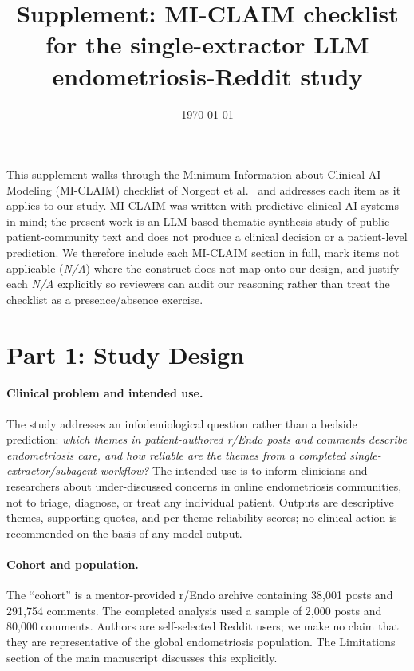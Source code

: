 \documentclass[11pt]{article}
\title{Supplement: MI-CLAIM checklist for the single-extractor
LLM endometriosis-Reddit study}
\date{\today}
\begin{document}
\maketitle

\noindent
This supplement walks through the Minimum Information about Clinical AI
Modeling (MI-CLAIM) checklist of Norgeot et al.~\cite{norgeot2020miclaim}
and addresses each item as it applies to our study. MI-CLAIM was written
with predictive clinical-AI systems in mind; the present work is an
LLM-based thematic-synthesis study of public patient-community text and
does not produce a clinical decision or a patient-level prediction. We
therefore include each MI-CLAIM section in full, mark items not
applicable (\emph{N/A}) where the construct does not map onto our
design, and justify each \emph{N/A} explicitly so reviewers can audit
our reasoning rather than treat the checklist as a presence/absence
exercise.

\section*{Part 1: Study Design}

\paragraph{Clinical problem and intended use.}
The study addresses an infodemiological question rather than a bedside
prediction: \emph{which themes in patient-authored r/Endo posts and
comments describe endometriosis care, and how reliable are the themes
from a completed single-extractor/subagent workflow?} The intended use
is to inform clinicians and researchers about under-discussed concerns
in online endometriosis communities, not to triage, diagnose, or treat
any individual patient. Outputs are descriptive themes, supporting
quotes, and per-theme reliability scores; no clinical action is
recommended on the basis of any model output.

\paragraph{Cohort and population.}
The ``cohort'' is a mentor-provided r/Endo archive containing
38{,}001 posts and 291{,}754 comments. The completed analysis used a
sample of 2{,}000 posts and 80{,}000 comments. Authors are
self-selected Reddit users; we make no claim that they are
representative of the global endometriosis population. The Limitations
section of the main manuscript discusses this explicitly.
\end{document}
